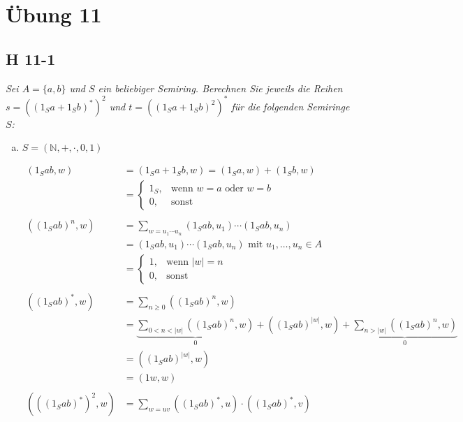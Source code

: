 \documentclass{scrartcl}
\begin{document}
\section{Übung 11}

\subsection{H 11-1}

\textsl{Sei $A = \{a, b\}$ und $S$ ein beliebiger Semiring. Berechnen Sie jeweils die Reihen $s = ((1_S a + 1_S b)^*)^2$ und $t = ((1_S a + 1_S b)^2)^*$ für die folgenden Semiringe $S$:}

\begin{enumerate}[(a)]
    \item $S = (\mathbb{N}, +, \cdot, 0, 1)$

      \begin{align*}
        (1_S ab, w) &= (1_S a + 1_S b, w) = (1_S a, w) + (1_S b, w)\\
          &= \begin{cases}
            1_S, &\text{wenn } w = a \text{ oder } w = b\\
            0,   &\text{sonst}
          \end{cases}
          \\
        \\
        ((1_S ab)^n, w) &=
          \sum_{w = u_1 \cdots u_n} (1_S ab, u_1) \cdots (1_S ab, u_n)\\
          &= (1_S ab, u_1) \cdots (1_S ab, u_n) \text{ mit } u_1, \ldots, u_n \in A\\
          &= \begin{cases}
            1, &\text{wenn } |w| = n\\
            0, &\text{sonst}
          \end{cases}
          \\
        \\
        ((1_S ab)^*, w) &= \sum_{n \geq 0} ((1_S ab)^n, w)\\
          &= \underbrace{\sum_{0 < n < |w|} ((1_S ab)^n, w)}_{0}
            + ((1_S ab)^{|w|}, w)
            + \underbrace{\sum_{n > |w|} ((1_S ab)^n, w)}_{0}\\
          &= ((1_S ab)^{|w|}, w)\\
          &= (1w, w)\\
        \\
        (((1_S ab)^*)^2, w) &= \sum_{w = uv} ((1_S ab)^*, u) \cdot ((1_S ab)^*, v)\\

\end{align*}
\end{enumerate}
\end{document}
